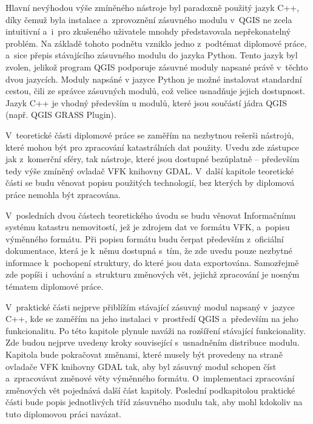\documentclass[a4paper,12pt,oneside]{book}
\begin{document}
Hlavní nevýhodou výše zmíněného nástroje byl paradoxně použitý jazyk C++,
díky čemuž byla instalace a~zprovoznění zásuvného modulu v~QGIS ne
zcela intuitivní a~i~pro zkušeného uživatele mnohdy představovala
nepřekonatelný problém. Na základě tohoto podnětu vzniklo jedno
z~podtémat diplomové práce, a~sice přepis stávajícího zásuvného
modulu do jazyka Python. Tento jazyk byl zvolen, jelikož program QGIS
podporuje zásuvné moduly napsané právě v~těchto dvou jazycích. 
Moduly napsáné v jazyce Python je možné instalovat standardní cestou, 
čili ze správce zásuvných modulů, což velice usnadňuje jejich dostupnost.
Jazyk C++ je vhodný především u modulů, které jsou součástí jádra QGIS
(např. QGIS GRASS Plugin).

V~teoretické části diplomové práce se zaměřím na nezbytnou rešerši
nástrojů, které mohou být pro zpracování katastrálních dat použity. 
Uvedu zde zástupce jak z~komerční sféry, tak nástroje, které
jsou dostupné bezúplatně -- především tedy výše zmíněný ovladač VFK
knihovny GDAL. V~další kapitole teoretické části se budu věnovat
popisu použitých technologií, bez kterých by diplomová práce nemohla
být zpracována.

V~posledních dvou částech teoretického úvodu se budu věnovat
Informačnímu systému katastru nemovitostí, jež je zdrojem dat ve
formátu VFK, a~popisu výměnného formátu. Při popisu formátu budu
čerpat především z~oficiální dokumentace, která je k~němu dostupná
s~tím, že zde uvedu pouze nezbytné informace k~pochopení struktury, do
které jsou data exportována. Samozřejmě zde popíši i~uchování
a~strukturu změnových vět, jejichž zpracování je nosným tématem
diplomové práce.

V~praktické části nejprve přiblížím stávající zásuvný modul napsaný
v~jazyce C++, kde se zaměřím na jeho instalaci v~prostředí QGIS
a~především na jeho funkcionalitu. Po této kapitole plynule naváži na
rozšíření stávající funkcionality. Zde budou nejprve uvedeny kroky
související s~usnadněním distribuce modulu. Kapitola bude pokračovat
změnami, které musely být provedeny na straně ovladače VFK knihovny
GDAL tak, aby byl zásuvný modul schopen číst a~zpracovávat změnové
věty výměnného formátu. O~implementaci zpracování změnových vět
pojednává dal\-ší část kapitoly. Poslední podkapitolou praktické části
bude popis jednotlivých tříd zásuvného modulu tak, aby mohl kdokoliv
na tuto diplomovou práci navázat.
\end{document}
